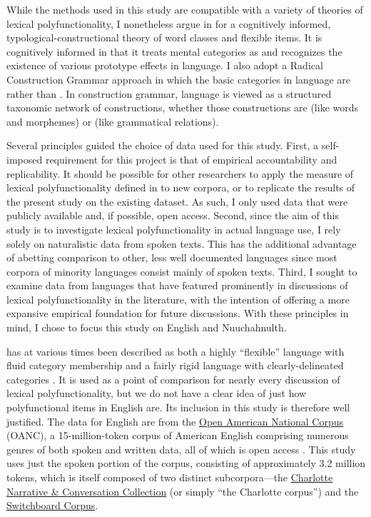 While the methods used in this study are compatible with a variety of theories of lexical polyfunctionality, I nonetheless argue in  for a cognitively informed, typological-constructional theory of word classes and flexible items. It is cognitively informed in that it treats mental categories as  and recognizes the existence of various prototype effects in language. I also adopt a Radical Construction Grammar approach \parencite{Croft2001b} in which the basic categories in language are  rather than  . In construction grammar, language is viewed as a structured taxonomic network of constructions, whether those constructions are  (like words and morphemes) or  (like grammatical relations).

Several principles guided the choice of data used for this study. First, a self-imposed requirement for this project is that of empirical accountability and replicability. It should be possible for other researchers to apply the measure of lexical polyfunctionality defined in  to new corpora, or to replicate the results of the present study on the existing dataset. As such, I only used data that were publicly available and, if possible, open access. Second, since the aim of this study is to investigate lexical polyfunctionality in actual language use, I rely solely on naturalistic data from spoken texts. This has the additional advantage of abetting comparison to other, less well documented languages since most corpora of minority languages consist mainly of spoken texts. Third, I sought to examine data from languages that have featured prominently in discussions of lexical polyfunctionality in the literature, with the intention of offering a more expansive empirical foundation for future discussions. With these principles in mind, I chose to focus this study on English and Nuuchahnulth.

 has at various times been described as both a highly \enquote{flexible} language with fluid category membership \parencites[47--48]{Crystal1967}{Vonen1994}[75--76]{Croft2000}[69]{Croft2001b}{Farrell2001}{Cannon1985} and a fairly rigid language with clearly-delineated categories \parencites[710]{Rijkhoff2007}[4, 11, 12]{SchachterShopen2007}[122, 126]{Velupillai2012}. It is used as a point of comparison for nearly every discussion of lexical polyfunctionality, but we do not have a clear idea of just how polyfunctional items in English are. Its inclusion in this study is therefore well justified. The data for English are from the \href{http://www.anc.org/}{Open American National Corpus} (OANC), a 15-million-token corpus of American English comprising numerous genres of both spoken and written data, all of which is open access \parencite{OANC}. This study uses just the spoken portion of the corpus, consisting of approximately 3.2 million tokens, which is itself composed of two distinct subcorpora—the \href{https://newsouthvoices.uncc.edu}{Charlotte Narrative \& Conversation Collection} (or simply \enquote{the Charlotte corpus}) and the \href{https://catalog.ldc.upenn.edu/LDC97S62}{Switchboard Corpus}.

